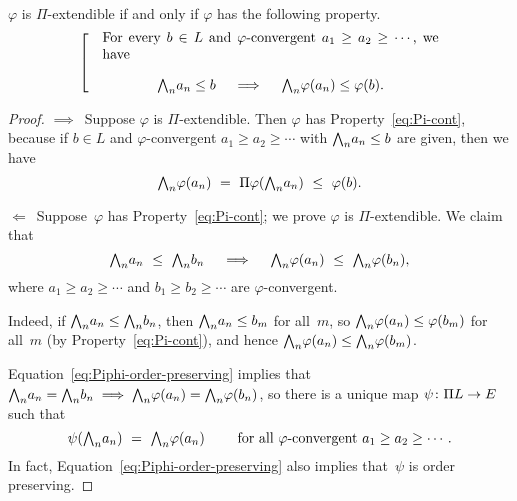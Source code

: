 \documentclass[main.tex]{subfiles}
\begin{document}
%
%
\begin{lem}
$\varphi$ is $\Pi$-extendible
if and only if  $\varphi$
has the following property.
\begin{equation}
\label{eq:Pi-cont}
\left[ \quad
\begin{minipage}{.7\columnwidth}
For every $b\in L$ and $\varphi$-convergent 
 $a_1 \geq a_2 \geq \dotsb$,
we have
\begin{equation*}
\bw_n a_n \leq b
\quad\implies\quad
\bw_n \varphi (a_n) \leq \varphi(b).
\end{equation*}
\end{minipage}
\right.
\end{equation}
\end{lem}
\begin{proof}
$\implies$\ 
Suppose $\varphi$ is $\Pi$-extendible.
Then $\varphi$ has Property~\eqref{eq:Pi-cont},
because if $b\in L$ and $\varphi$-convergent $a_1 \geq a_2 \geq \dotsb$
with $\textstyle{\bigwedge}_n a_n \leq b$ are given,
then we have
\begin{equation*}
\bw_n \varphi(a_n) 
\ =\ 
\Pi\varphi(\bw_n a_n)
\ \leq\ 
\varphi(b).
\end{equation*}

\noindent$\Longleftarrow$\ 
Suppose~$\varphi$ has Property~\eqref{eq:Pi-cont};
we prove $\varphi$ is $\Pi$-extendible.
We claim that
\begin{equation}
\label{eq:Piphi-order-preserving}
\textstyle{\bigwedge}_n a_n \ \leq\ \textstyle{\bigwedge}_n b_n 
\quad\implies\quad
\textstyle{\bigwedge}_n \varphi(a_n) \ \leq\ \textstyle{\bigwedge}_n \varphi(b_n),
\end{equation}
where $a_1 \geq a_2 \geq \dotsb$ and $b_1 \geq b_2 \geq \dotsb$
are $\varphi$-convergent.

Indeed,
if $\textstyle{\bigwedge}_n a_n \leq \textstyle{\bigwedge}_n b_n$,
then $\textstyle{\bigwedge}_n a_n \leq b_m$ for all~$m$,
so $\textstyle{\bigwedge}_n \varphi(a_n) \leq \varphi(b_m)$ for all~$m$
(by Property~\eqref{eq:Pi-cont}),
and hence $\textstyle{\bigwedge}_n \varphi(a_n) \leq \textstyle{\bigwedge}_n \varphi(b_m)$.

Equation~\eqref{eq:Piphi-order-preserving} implies that
 $\textstyle{\bigwedge}_n a_n = \textstyle{\bigwedge}_n b_n \implies \textstyle{\bigwedge}_n\varphi(a_n) = \textstyle{\bigwedge}_n \varphi(b_n)$,
so there is a unique map $\psi\colon \Pi L \rightarrow E$ such that
\begin{equation*}
\psi(\textstyle{\bigwedge}_n a_n) \ =\ \textstyle{\bigwedge}_n \varphi(a_n)
\qquad
\text{ for all $\varphi$-convergent }a_1 \geq a_2 \geq \dotsb.
\end{equation*}
In fact, 
Equation~\eqref{eq:Piphi-order-preserving}
also implies that~$\psi$ is order preserving.


\end{proof}
\end{document}
